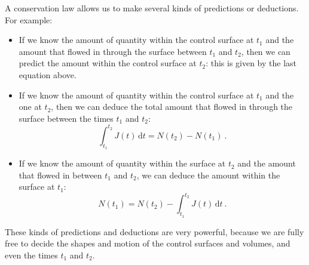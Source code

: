 \documentclass[a4paper,12pt,%
onecolumn,oneside,titlepage,%
british%
]{memoir}
\newcommand*{\di}{\mathrm{d}}%
\renewcommand*{\|}[1][]{\nonscript\:#1\vert\nonscript\:\mathopen{}}
\newcommand*{\yN}{N}
\newcommand*{\yJ}{J}
\begin{document}
A conservation law allows us to make several kinds of predictions or deductions. For example:
\begin{itemize}
\item If we know the amount of quantity within the control surface at $t_{1}$ and the amount that flowed in through the surface between $t_{1}$ and $t_{2}$, then we can predict the amount within the control surface at $t_{2}$: this is given by the last equation above.
  
\item If we know the amount of quantity within the control surface at $t_{1}$ and the one at $t_{2}$, then we can deduce the total amount that flowed in through the surface between the times $t_{1}$ and $t_{2}$:
  \begin{equation*}
    \int_{t_{1}}^{t_{2}}\!\!\yJ(t)\, \di t = \yN(t_{2}) - \yN(t_{1}) \ .
  \end{equation*}

\item If we know the amount of quantity within the surface at $t_{2}$ and the amount that flowed in between $t_{1}$ and $t_{2}$, we can deduce the amount within the surface at $t_{1}$:
  \begin{equation*}
    \yN(t_{1}) = \yN(t_{2}) - \int_{t_{1}}^{t_{2}}\!\!\yJ(t)\, \di t \ .
  \end{equation*}
\end{itemize}

These kinds of predictions and deductions are very powerful, because we are fully free to decide the shapes and motion of the control surfaces and volumes, and even the times $t_{1}$ and $t_{2}$.
\end{document}
